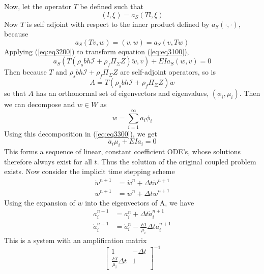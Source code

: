 \documentclass{article}
\begin{document}
Now, let the operator $T$ be defined such that
\begin{equation}  (l,\xi) = a_S(Tl, \xi)  \label{eq:eq3200} \end{equation}
Now $T$ is self adjoint with respect to the inner product defined by $a_S(\cdot, \cdot)$, because
\[ a_S(Tv,w) = (v,w) = a_S(v,Tw) \]
Applying (\ref{eq:eq3200}) to transform equation (\ref{eq:eq3100}), 
\begin{equation} a_S(T(\rho_sbh\mathcal{I}+\rho_f \Pi_{\Sigma}Z)\ddot{w}, v) + EI a_S(w,v) = 0 \label{eq:eq3300} \end{equation}
Then because $T$ and $\rho_sbh\mathcal{I}+\rho_f \Pi_{\Sigma}Z$ are self-adjoint operators, so is
\begin{equation} A = T(\rho_sbh\mathcal{I}+\rho_f \Pi_{\Sigma}Z)\ddot{w} \label{eq:eq3400}  \end{equation}
so that $A$ has an orthonormal set of eigenvectors and eigenvalues, $(\phi_i, \mu_i)$.  
Then we can decompose and $w \in W$ as 
\begin{equation} w = \sum_{i=1}^{\infty} a_i \phi_i \label{eq:eq3500}  \end{equation}
Using this decomposition in (\ref{eq:eq3300}), we get
\begin{equation} \ddot{a}_i \mu_i + EI a_i = 0 \label{eq:eq3600}  \end{equation}
This forms a sequence of linear, constant coefficient ODE's, whose solutions therefore always exist for all $t$.  
Thus the solution of the original coupled problem exists.
Now consider the implicit time stepping scheme
\begin{equation}
\begin{aligned}
\dot{w}^{n+1} &= \dot{w}^n+\Delta t\ddot{w}^{n+1} \\
w^{n+1} &= w^n+\Delta t\dot{w}^{n+1}  
\label{eq:eq3700}
\end{aligned}
\end{equation}
Using the expansion of $w$ into the eigenvectors of A, we have
\begin{equation}
\begin{aligned}
a_i^{n+1} &= a_i^n+\Delta t \dot{a}_i^{n+1} \\
\dot{a}_i^{n+1} &= \dot{a}_i^n - \frac{EI}{\mu_i} \Delta t a_i^{n+1}
\label{eq:eq3800}
\end{aligned}
\end{equation}
This is a system with an amplification matrix
\[ \begin{bmatrix}
1 & -\Delta t \\
\frac{EI}{\mu_i}\Delta t & 1 
\end{bmatrix}^{-1}
\]
\end{document}
